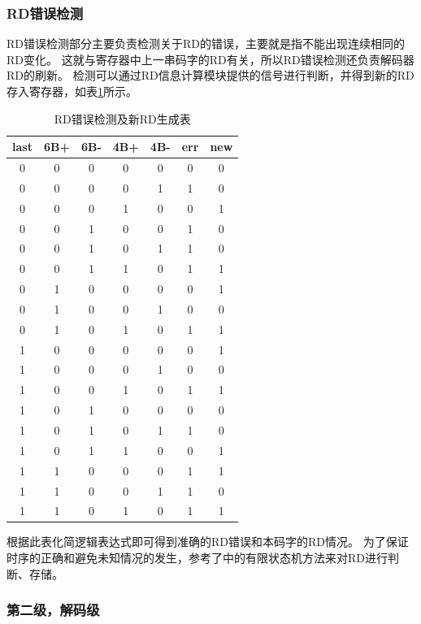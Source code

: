 \documentclass[UTF8]{ctexart}
\begin{document}
\subsubsection{RD错误检测}

RD错误检测部分主要负责检测关于RD的错误，主要就是指不能出现连续相同的RD变化。
这就与寄存器中上一串码字的RD有关，所以RD错误检测还负责解码器RD的刷新。
检测可以通过RD信息计算模块提供的信号进行判断，并得到新的RD存入寄存器，如表\ref{tab:tab_RD_err}所示。

\begin{table}[H]
\centering
\caption{RD错误检测及新RD生成表}
\label{tab:tab_RD_err}
\begin{tabular}{|c|c|c|c|c|c|c|}
\hline
	last	&	6B+	&	6B-	&	4B+	&	4B-	&	err	&	new	\\
\hline
	0 	 	&	0 	&	0 	& 	0	&	0 	&	0 	&	0 	\\
	0 	 	&	0 	&	0 	& 	0	&	1 	&	1 	&	0 	\\
	0 	 	&	0 	&	0 	& 	1	&	0 	&	0 	&	1 	\\
	0 	 	&	0 	&	1 	& 	0	&	0 	&	1 	&	0 	\\
	0 	 	&	0 	&	1 	& 	0	&	1 	&	1 	&	0 	\\
	0 	 	&	0 	&	1 	& 	1	&	0 	&	1 	&	1 	\\
	0 	 	&	1 	&	0 	& 	0	&	0 	&	0 	&	1 	\\
	0 	 	&	1 	&	0 	& 	0	&	1 	&	0 	&	0 	\\
	0 	 	&	1 	&	0 	& 	1	&	0 	&	1 	&	1 	\\
	1 	 	&	0 	&	0 	& 	0	&	0 	&	0 	&	1 	\\
	1 	 	&	0 	&	0 	& 	0	&	1 	&	0 	&	0 	\\
	1 	 	&	0 	&	0 	& 	1	&	0 	&	1 	&	1 	\\
	1 	 	&	0 	&	1 	& 	0	&	0 	&	0 	&	0 	\\
	1 	 	&	0 	&	1 	& 	0	&	1 	&	1 	&	0 	\\
	1 	 	&	0 	&	1 	& 	1	&	0 	&	0 	&	1 	\\
	1 	 	&	1 	&	0 	& 	0	&	0 	&	1 	&	1 	\\
	1 	 	&	1 	&	0 	& 	0	&	1 	&	1 	&	0 	\\
	1 	 	&	1 	&	0 	& 	1	&	0 	&	1 	&	1 	\\
\hline
\end{tabular}
\end{table}

根据此表化简逻辑表达式即可得到准确的RD错误和本码字的RD情况。
为了保证时序的正确和避免未知情况的发生，参考了\cite{AlKafi2013}中的有限状态机方法来对RD进行判断、存储。

\subsubsection{第二级，解码级}
\end{document}
